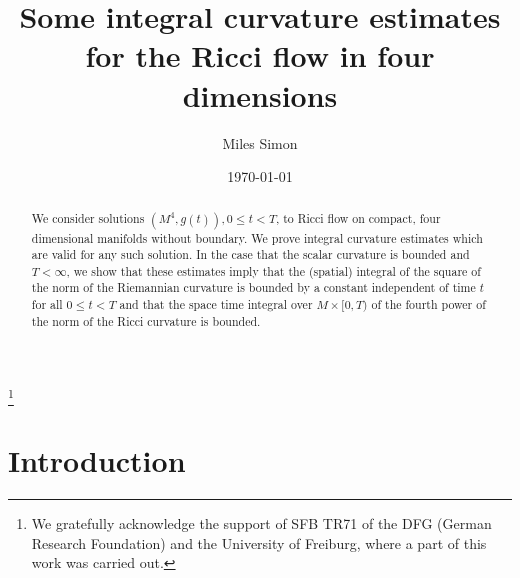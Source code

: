 \documentclass{amsart}
\numberwithin{equation}{section}
\theoremstyle{definition}
\theoremstyle{remark}
\begin{document}
\title[Ricci flow integral curvature estimates]{Some integral curvature estimates for the Ricci flow in four
  dimensions}
\thanks{We gratefully acknowledge the support of SFB TR71 of the DFG (German Research Foundation) and 
the University of Freiburg, where a part of this work was carried out.}

\author{Miles Simon}
\address{Miles Simon: Otto von Guericke University, Magdeburg, IAN,
  Universit\"atsplatz 2, Magdeburg 39104, Germany}
\curraddr{}

\date{\today}

\dedicatory{}


\begin{abstract}
We consider solutions $(M^4,g(t)),  0 \leq t <T$,  to Ricci flow on
compact, four dimensional manifolds without boundary.
We prove integral curvature estimates which are valid for any such solution.
In the case that the scalar curvature is bounded and $T< \infty$, we show that
these estimates imply that the (spatial) integral of the square of the norm of the Riemannian curvature is bounded by
a constant independent of time $t$ for all $0 \leq t<T$ and that the space time
integral over $M \times [0,T)$ of the fourth power of the norm of the Ricci curvature is
bounded.
\end{abstract}

\maketitle
\section{Introduction}
\end{document}
